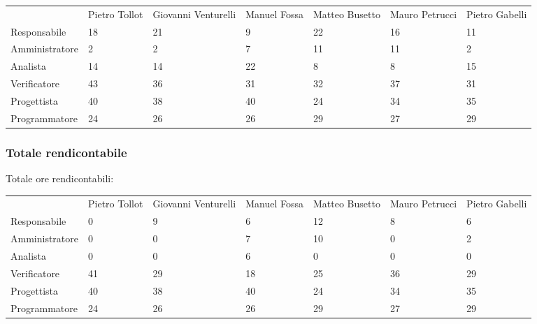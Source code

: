 \begin{table}[h] %
\begin{tabular}{lllllll}
               & Pietro Tollot & Giovanni Venturelli & Manuel Fossa & Matteo Busetto & Mauro Petrucci & Pietro Gabelli \\
Responsabile   & 18            & 21                  & 9            & 22             & 16             & 11             \\
Amministratore & 2             & 2                   & 7            & 11             & 11             & 2              \\
Analista       & 14            & 14                  & 22           & 8              & 8              & 15             \\
Verificatore   & 43            & 36                  & 31           & 32             & 37             & 31             \\
Progettista    & 40            & 38                  & 40           & 24             & 34             & 35             \\
Programmatore  & 24            & 26                  & 26           & 29             & 27             & 29            
\end{tabular}
\end{table}


\subsubsection{Totale rendicontabile}
Totale ore rendicontabili:

\begin{table}[h] %
\begin{tabular}{lllllll}
               & Pietro Tollot & Giovanni Venturelli & Manuel Fossa & Matteo Busetto & Mauro Petrucci & Pietro Gabelli \\
Responsabile   & 0             & 9                   & 6            & 12             & 8              & 6              \\
Amministratore & 0             & 0                   & 7            & 10             & 0              & 2              \\
Analista       & 0             & 0                   & 6            & 0              & 0              & 0              \\
Verificatore   & 41            & 29                  & 18           & 25             & 36             & 29             \\
Progettista    & 40            & 38                  & 40           & 24             & 34             & 35             \\
Programmatore  & 24            & 26                  & 26           & 29             & 27             & 29            
\end{tabular}
\end{table}


